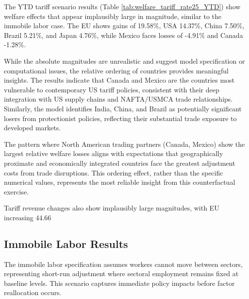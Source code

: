 The YTD tariff scenario results (Table \ref{tab:welfare_tariff_rate25_YTD}) show welfare effects that appear implausibly large in magnitude, similar to the immobile labor case. The EU shows gains of 19.58\%, USA 14.37\%, China 7.50\%, Brazil 5.21\%, and Japan 4.76\%, while Mexico faces losses of -4.91\% and Canada -1.28\%.

While the absolute magnitudes are unrealistic and suggest model specification or computational issues, the relative ordering of countries provides meaningful insights. The results indicate that Canada and Mexico are the countries most vulnerable to contemporary US tariff policies, consistent with their deep integration with US supply chains and NAFTA/USMCA trade relationships. Similarly, the model identifies India, China, and Brazil as potentially significant losers from protectionist policies, reflecting their substantial trade exposure to developed markets.

The pattern where North American trading partners (Canada, Mexico) show the largest relative welfare losses aligns with expectations that geographically proximate and economically integrated countries face the greatest adjustment costs from trade disruptions. This ordering effect, rather than the specific numerical values, represents the most reliable insight from this counterfactual exercise.

Tariff revenue changes also show implausibly large magnitudes, with EU increasing 44.66%

\begin{landscape}
    \vspace*{\fill}
    
    \vspace*{\fill}
\end{landscape}
\subsection{Immobile Labor Results}

The immobile labor specification assumes workers cannot move between sectors, representing short-run adjustment where sectoral employment remains fixed at baseline levels. This scenario captures immediate policy impacts before factor reallocation occurs.

